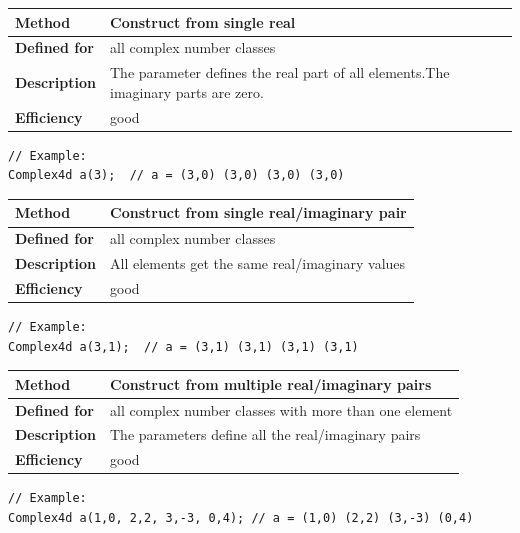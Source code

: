 \documentclass[11pt,a4paper,oneside,openright]{report}
\newcommand{\vspacesmall}{\vspace{3mm}}
\newcommand{\vspacebig}{\vspace{6mm}}
\begin{document}
\begin{tabular}{|p{25mm}|p{100mm}|}
\hline
\bfseries Method & Construct from single real \\ \hline
\bfseries Defined for & all complex number classes \\ \hline
\bfseries Description & The parameter defines the real part of all elements.\newline The imaginary parts are zero. \\ \hline
\bfseries Efficiency & good \\ \hline
\end{tabular}
\vspacesmall

\begin{lstlisting}[frame=none]
// Example:
Complex4d a(3);  // a = (3,0) (3,0) (3,0) (3,0)
\end{lstlisting}
\vspacebig


\begin{tabular}{|p{25mm}|p{100mm}|}
\hline
\bfseries Method & Construct from single real/imaginary pair \\ \hline
\bfseries Defined for & all complex number classes \\ \hline
\bfseries Description & All elements get the same real/imaginary values \\ \hline
\bfseries Efficiency & good \\ \hline
\end{tabular}
\vspacesmall

\begin{lstlisting}[frame=none]
// Example:
Complex4d a(3,1);  // a = (3,1) (3,1) (3,1) (3,1)
\end{lstlisting}
\vspacebig


\begin{tabular}{|p{25mm}|p{100mm}|}
\hline
\bfseries Method & Construct from multiple real/imaginary pairs \\ \hline
\bfseries Defined for & all complex number classes with more than one element \\ \hline
\bfseries Description & The parameters define all the real/imaginary pairs \\ \hline
\bfseries Efficiency & good \\ \hline
\end{tabular}
\vspacesmall

\begin{lstlisting}[frame=none]
// Example:
Complex4d a(1,0, 2,2, 3,-3, 0,4); // a = (1,0) (2,2) (3,-3) (0,4)
\end{lstlisting}
\vspacebig
\end{document}
